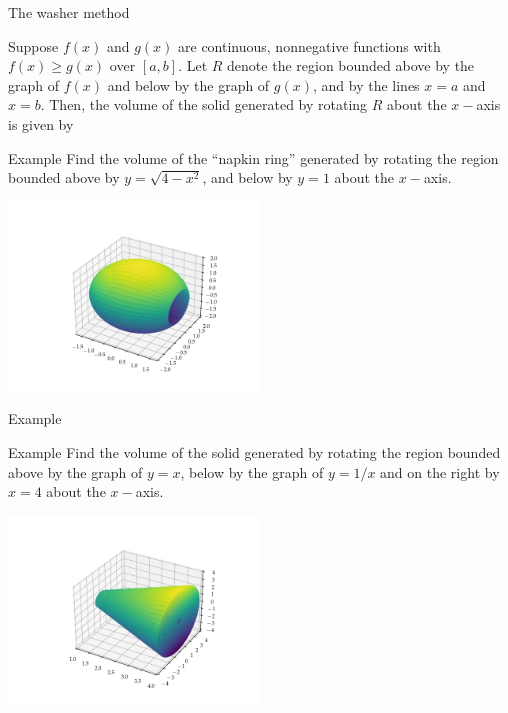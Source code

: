 \documentclass[presentation]{beamer}
\begin{document}
\begin{frame}[label={sec:org5395693}]{The washer method}
\begin{theorem}
Suppose \(f \left( x \right)\) and \(g \left( x \right)\) are
continuous, nonnegative functions with \(f \left( x \right) \ge g
\left( x \right)\) over \(\left[ a,b \right]\).  Let \(R\) denote
the region bounded above by the graph of \(f \left( x \right)\) and
below by the graph of \(g \left( x \right)\), and by the lines \(x=a\) and \(x=b\).  Then, the volume of the solid generated by rotating
\(R\) about the \(x-\)axis is given by
\[
 \]
 \phantom{butts}

\phantom{butts}
\end{theorem}
\end{frame}

\begin{frame}[label={sec:orga882c07}]{Example}
Find the volume of the ``napkin ring'' generated by rotating the region
bounded above by \(y = \sqrt{4-x^2}\), and below by \(y = 1\) about
the \(x-\)axis.

\begin{center}
\includegraphics[width=0.5\textwidth]{../img/day007-ex02.png}
\end{center}
\vspace{10in}
\end{frame}

\begin{frame}[label={sec:org3c557a7}]{Example}
\end{frame}

\begin{frame}[label={sec:org9885078}]{Example}
Find the volume of the solid generated by rotating the region bounded
above by the graph of \(y = x\), below by the graph of \(y = 1/x\)
and on the right by \(x = 4\) about the \(x-\)axis.

\begin{center}
\includegraphics[width=0.5\textwidth]{../img/day007-ex03.png}
\end{center}
\vspace{10in}
\end{frame}
\end{document}
